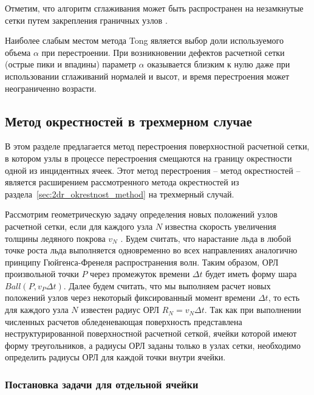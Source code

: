Отметим, что алгоритм сглаживания может быть распространен на незамкнутые сетки путем закрепления граничных узлов \cite{Shumilin2021Smooth}.

Наиболее слабым местом метода Tong является выбор доли используемого объема $\alpha$ при перестроении.
При возникновении дефектов расчетной сетки (острые пики и впадины) параметр $\alpha$ оказывается близким к нулю даже при использовании сглаживаний нормалей и высот, и время перестроения может неограниченно возрасти.


\subsection{Метод окрестностей в трехмерном случае}

В этом разделе предлагается метод перестроения поверхностной расчетной сетки, в котором узлы в процессе перестроения смещаются на границу окрестности одной из инцидентных ячеек.
Этот метод перестроения -- метод окрестностей -- является расширением рассмотренного метода окрестностей из раздела~\ref{sec:2dr_okrestnost_method} на трехмерный случай.

Рассмотрим геометрическую задачу определения новых положений узлов расчетной сетки, если для каждого узла $N$ известна скорость увеличения толщины ледяного покрова $v_N$ \cite{Rybakov2023GeoRemesh}.
Будем считать, что нарастание льда в любой точке роста льда выполняется одновременно во всех направлениях аналогично принципу Гюйгенса-Френеля распространения волн.
Таким образом, ОРЛ\label{abbr:orl-2} произвольной точки $P$ через промежуток времени $\Delta t$ будет иметь форму шара $Ball(P, v_P \Delta t)$.
Далее будем считать, что мы выполняем расчет новых положений узлов через некоторый фиксированный момент времени $\Delta t$, то есть для каждого узла $N$ известен радиус ОРЛ $R_N = v_N \Delta t$.
Так как при выполнении численных расчетов обледеневающая поверхность представлена неструктурированной поверхностной расчетной сеткой, ячейки которой имеют форму треугольников, а радиусы ОРЛ заданы только в узлах сетки, необходимо определить радиусы ОРЛ для каждой точки внутри ячейки.

\subsubsection{Постановка задачи для отдельной ячейки}

